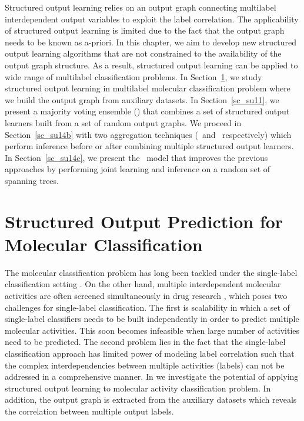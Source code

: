 {Structured output learning relies on an output graph connecting multilabel interdependent output variables to exploit the label correlation.
The applicability of structured output learning is limited due to the fact that the output graph needs to be known as a-priori.
In this chapter, we aim to develop new structured output learning algorithms that are not constrained to the availability of the output graph structure.
As a result, structured output learning can be applied to wide range of multilabel classification problems.
In Section~\ref{sc_su10}, we study structured output learning in multilabel molecular classification problem where we build the output graph from auxiliary datasets.
In Section~\ref{sc_su11}, we present a majority voting ensemble (\mve) that combines a set of structured output learners built from a set of random output graphs.
We proceed in Section~\ref{sc_su14b} with two aggregation techniques (\amm\ and \mam\ respectively) which perform inference before or after combining multiple structured output learners.
In Section~\ref{sc_su14c}, we present the \rta\ model that improves the previous approaches by performing joint learning and inference on a random set of spanning trees.



%
%
\section{Structured Output Prediction for Molecular Classification} \label{sc_su10}

The molecular classification problem has long been tackled under the single-label classification setting \citep{Menchetti05weighted,Singh12qsar,Dutt12classification}.
On the other hand, multiple interdependent molecular activities are often screened simultaneously in drug research \citep{Shoemaker06the}, which poses two challenges for single-label classification.
The first is scalability in which a set of single-label classifiers needs to be built independently in order to predict multiple molecular activities.
This soon becomes infeasible when large number of activities need to be predicted.
The second problem lies in the fact that the single-label classification approach has limited power of modeling label correlation such that the complex interdependencies between multiple activities (labels) can not be addressed in a comprehensive manner.
In  we investigate the potential of applying structured output learning to molecular activity classification problem.
In addition, the output graph is extracted from the auxiliary datasets which reveals the correlation between multiple output labels.


}
